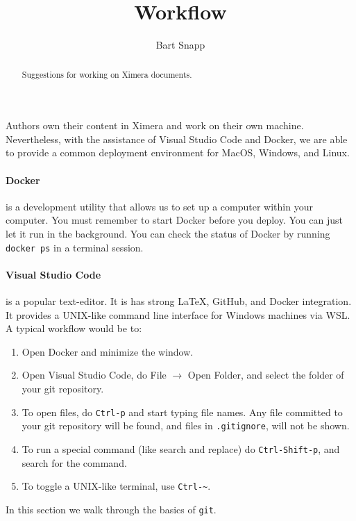 \documentclass{ximera}
\title{Workflow}
\author{Bart Snapp}
\begin{document}
\begin{abstract}
    Suggestions for working on Ximera documents.
\end{abstract}
\maketitle

Authors own their content in Ximera and work on their own machine.
Nevertheless, with the assistance of Visual Studio Code and Docker, we are able
to provide a common deployment environment for MacOS, Windows, and Linux.


\paragraph{Docker} is a development utility that allows us to set up a computer
within your
computer. You must remember to start Docker before you deploy. You can just let
it run in the background. You can check the status of Docker by running
\verb!docker ps! in a terminal session.

\paragraph{Visual Studio Code}
is a popular text-editor. It is has strong \LaTeX, GitHub,
and Docker integration. It provides a UNIX-like command line interface for
Windows machines via WSL. A typical workflow would be to:
\begin{enumerate}
    \item Open Docker and minimize the window.
    \item Open Visual Studio Code, do File $\to$ Open Folder, and select the
          folder of your git repository.
    \item To open files, do \verb!Ctrl-p! and start typing file names. Any
          file
          committed to your git repository will be found, and files in
          \verb!.gitignore!, will not be shown.
    \item To run a special command (like search and replace) do
          \verb!Ctrl-Shift-p!, and search for the command.
    \item To toggle a UNIX-like terminal, use \verb!Ctrl-~!.
\end{enumerate}


In this section we walk through the basics of \verb!git!.
\end{document}
